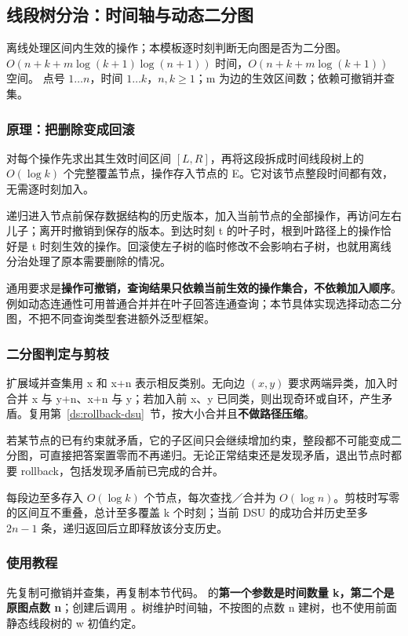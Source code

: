 \subsection{线段树分治：时间轴与动态二分图}
\label{ds:time-segment}
\AlgorithmInfo
    {离线处理区间内生效的操作；本模板逐时刻判断无向图是否为二分图。}
    {$O(n+k+m\log(k+1)\log(n+1))$ 时间，$O(n+k+m\log(k+1))$ 空间。}
    {点号 $1\ldots n$，时间 $1\ldots k$，$n,k\ge1$；m 为边的生效区间数；依赖可撤销并查集。}
\subsubsection*{原理：把删除变成回滚}
对每个操作先求出其生效时间区间 $[L,R]$，再将这段拆成时间线段树上的 $O(\log k)$ 个完整覆盖节点，操作存入节点的 E。它对该节点整段时间都有效，无需逐时刻加入。

递归进入节点前保存数据结构的历史版本，加入当前节点的全部操作，再访问左右儿子；离开时撤销到保存的版本。到达时刻 t 的叶子时，根到叶路径上的操作恰好是 t 时刻生效的操作。回滚使左子树的临时修改不会影响右子树，也就用离线分治处理了原本需要删除的情况。

通用要求是\textbf{操作可撤销，查询结果只依赖当前生效的操作集合，不依赖加入顺序}。例如动态连通性可用普通合并并在叶子回答连通查询；本节具体实现选择动态二分图，不把不同查询类型套进额外泛型框架。

\subsubsection*{二分图判定与剪枝}
扩展域并查集用 x 和 x+n 表示相反类别。无向边 $(x,y)$ 要求两端异类，加入时合并 x 与 y+n、x+n 与 y；若加入前 x、y 已同类，则出现奇环或自环，产生矛盾。复用第~\ref{ds:rollback-dsu}~节，按大小合并且\textbf{不做路径压缩}。

若某节点的已有约束就矛盾，它的子区间只会继续增加约束，整段都不可能变成二分图，可直接把答案置零而不再递归。无论正常结束还是发现矛盾，退出节点时都要 rollback，包括发现矛盾前已完成的合并。

每段边至多存入 $O(\log k)$ 个节点，每次查找／合并为 $O(\log n)$。剪枝时写零的区间互不重叠，总计至多覆盖 k 个时刻；当前 DSU 的成功合并历史至多 $2n-1$ 条，递归返回后立即释放该分支历史。

\subsubsection*{使用教程}
先复制可撤销并查集，再复制本节代码。 的\textbf{第一个参数是时间数量 k，第二个是原图点数 n}；创建后调用 。树维护时间轴，不按图的点数 n 建树，也不使用前面静态线段树的 w 初值约定。

